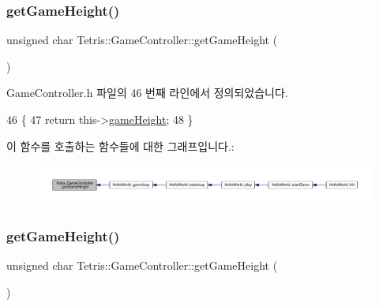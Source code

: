 \subsubsection{\texorpdfstring{get\+Game\+Height()}{getGameHeight()}\hspace{0.1cm}{\footnotesize\ttfamily [1/2]}}
{\footnotesize\ttfamily unsigned char Tetris\+::\+Game\+Controller\+::get\+Game\+Height (\begin{DoxyParamCaption}{ }\end{DoxyParamCaption})\hspace{0.3cm}{\ttfamily [inline]}}



Game\+Controller.\+h 파일의 46 번째 라인에서 정의되었습니다.


\begin{DoxyCode}
46                                      \{
47             \textcolor{keywordflow}{return} this->\hyperlink{class_tetris_1_1_game_controller_a8e3adc647ed382de0ff541417bea9b33}{gameHeight};
48         \}
\end{DoxyCode}
이 함수를 호출하는 함수들에 대한 그래프입니다.\+:
\nopagebreak
\begin{figure}[H]
\begin{center}
\leavevmode
\includegraphics[width=350pt]{db/dd2/class_tetris_1_1_game_controller_a10163479e02572450b886ff0654078b4_icgraph}
\end{center}
\end{figure}
\mbox{\label{class_tetris_1_1_game_controller_a10163479e02572450b886ff0654078b4}} 
\subsubsection{\texorpdfstring{get\+Game\+Height()}{getGameHeight()}\hspace{0.1cm}{\footnotesize\ttfamily [2/2]}}
{\footnotesize\ttfamily unsigned char Tetris\+::\+Game\+Controller\+::get\+Game\+Height (\begin{DoxyParamCaption}{ }\end{DoxyParamCaption})\hspace{0.3cm}{\ttfamily [inline]}}



